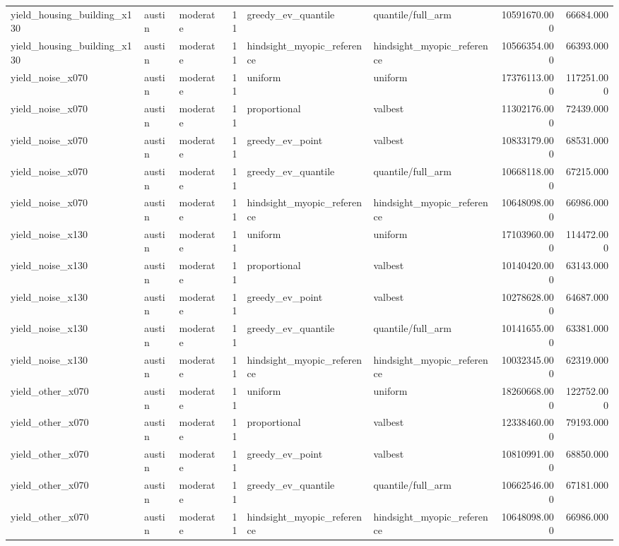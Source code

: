 \begin{tabular}{lllrllrr}
yield\_housing\_building\_x130 & austin & moderate & 11 & greedy\_ev\_quantile & quantile/full\_arm & 10591670.000 & 66684.000 \\
yield\_housing\_building\_x130 & austin & moderate & 11 & hindsight\_myopic\_reference & hindsight\_myopic\_reference & 10566354.000 & 66393.000 \\
yield\_noise\_x070 & austin & moderate & 11 & uniform & uniform & 17376113.000 & 117251.000 \\
yield\_noise\_x070 & austin & moderate & 11 & proportional & valbest & 11302176.000 & 72439.000 \\
yield\_noise\_x070 & austin & moderate & 11 & greedy\_ev\_point & valbest & 10833179.000 & 68531.000 \\
yield\_noise\_x070 & austin & moderate & 11 & greedy\_ev\_quantile & quantile/full\_arm & 10668118.000 & 67215.000 \\
yield\_noise\_x070 & austin & moderate & 11 & hindsight\_myopic\_reference & hindsight\_myopic\_reference & 10648098.000 & 66986.000 \\
yield\_noise\_x130 & austin & moderate & 11 & uniform & uniform & 17103960.000 & 114472.000 \\
yield\_noise\_x130 & austin & moderate & 11 & proportional & valbest & 10140420.000 & 63143.000 \\
yield\_noise\_x130 & austin & moderate & 11 & greedy\_ev\_point & valbest & 10278628.000 & 64687.000 \\
yield\_noise\_x130 & austin & moderate & 11 & greedy\_ev\_quantile & quantile/full\_arm & 10141655.000 & 63381.000 \\
yield\_noise\_x130 & austin & moderate & 11 & hindsight\_myopic\_reference & hindsight\_myopic\_reference & 10032345.000 & 62319.000 \\
yield\_other\_x070 & austin & moderate & 11 & uniform & uniform & 18260668.000 & 122752.000 \\
yield\_other\_x070 & austin & moderate & 11 & proportional & valbest & 12338460.000 & 79193.000 \\
yield\_other\_x070 & austin & moderate & 11 & greedy\_ev\_point & valbest & 10810991.000 & 68850.000 \\
yield\_other\_x070 & austin & moderate & 11 & greedy\_ev\_quantile & quantile/full\_arm & 10662546.000 & 67181.000 \\
yield\_other\_x070 & austin & moderate & 11 & hindsight\_myopic\_reference & hindsight\_myopic\_reference & 10648098.000 & 66986.000 \\

\end{tabular}
